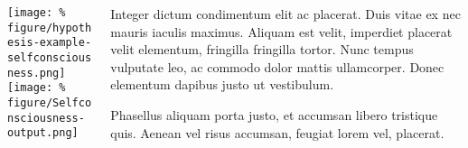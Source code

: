 \documentclass[unknownkeysallowed,usepdftitle=false, parskip=full]{beamer}
\newcommand{\secvariable}{nothing}
\begin{document}
\begin{frame}\label{\secvariable}
  \begin{columns}[t]
  \begin{column}[c]{0.44\textwidth}
\texttt{[image: \%
figure/hypothesis-example-selfconsciousness.png]}\\
\vspace{12pt}
\texttt{[image: \%
figure/Selfconsciousness-output.png]}
    \end{column}
    \begin{column}[c]{0.45\textwidth}
    \parbox{\linewidth}{

      Integer dictum condimentum elit ac placerat. Duis vitae ex nec mauris iaculis maximus. Aliquam est velit, imperdiet placerat velit elementum, fringilla fringilla tortor. Nunc tempus vulputate leo, ac commodo dolor mattis ullamcorper. Donec elementum dapibus justo ut vestibulum. 
      
      \vspace{12pt}
      
      Phasellus aliquam porta justo, et accumsan libero tristique quis. Aenean vel risus accumsan, feugiat lorem vel, placerat.
      }
    \end{column}
    
  \end{columns}

  
\end{frame}
\end{document}
